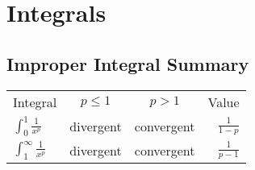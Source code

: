 \documentclass{article}
\begin{document}
\section{Integrals}


\subsection{Improper Integral Summary}

\def\arraystretch{3}
\begin{tabular}{lccr}
    Integral & $p \leq 1$ & $p > 1$ & Value\\
    $\displaystyle\int_{0}^{1} \frac{1}{x^p}$ & divergent & convergent & $\displaystyle\frac{1}{1-p}$\\
    $\displaystyle\int_{1}^{\infty} \frac{1}{x^p}$ & divergent & convergent & $\displaystyle\frac{1}{p-1}$\\
\end{tabular}
\end{document}

